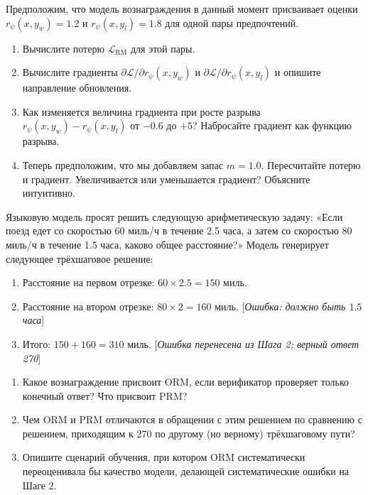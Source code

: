 \begin{exercise}
\label{ex:rm-loss-worked}
Предположим, что модель вознаграждения в данный момент присваивает оценки $r_\psi(x, y_w) = 1.2$ и $r_\psi(x, y_l) = 1.8$ для одной пары предпочтений.
\begin{enumerate}
  \item Вычислите потерю $\mathcal{L}_{\mathrm{RM}}$ для этой пары.
  \item Вычислите градиенты $\partial\mathcal{L}/\partial r_\psi(x,y_w)$ и $\partial\mathcal{L}/\partial r_\psi(x,y_l)$ и опишите направление обновления.
  \item Как изменяется величина градиента при росте разрыва $r_\psi(x,y_w) - r_\psi(x,y_l)$ от $-0.6$ до $+5$? Набросайте градиент как функцию разрыва.
  \item Теперь предположим, что мы добавляем запас $m = 1.0$. Пересчитайте потерю и градиент. Увеличивается или уменьшается градиент? Объясните интуитивно.
\end{enumerate}
\end{exercise}

\begin{exercise}
\label{ex:orm-prm}
Языковую модель просят решить следующую арифметическую задачу: «Если поезд едет со скоростью 60 миль/ч в течение 2.5 часа, а затем со скоростью 80 миль/ч в течение 1.5 часа, каково общее расстояние?» Модель генерирует следующее трёхшаговое решение:
\begin{enumerate}
  \item[Шаг 1:] Расстояние на первом отрезке: $60 \times 2.5 = 150$ миль.
  \item[Шаг 2:] Расстояние на втором отрезке: $80 \times 2 = 160$ миль. [\emph{Ошибка: должно быть $1.5$ часа}]
  \item[Шаг 3:] Итого: $150 + 160 = 310$ миль. [\emph{Ошибка перенесена из Шага 2; верный ответ 270}]
\end{enumerate}
\begin{enumerate}
  \item Какое вознаграждение присвоит ORM, если верификатор проверяет только конечный ответ? Что присвоит PRM?
  \item Чем ORM и PRM отличаются в обращении с этим решением по сравнению с решением, приходящим к 270 по другому (но верному) трёхшаговому пути?
  \item Опишите сценарий обучения, при котором ORM систематически переоценивала бы качество модели, делающей систематические ошибки на Шаге 2.
\end{enumerate}
\end{exercise}


